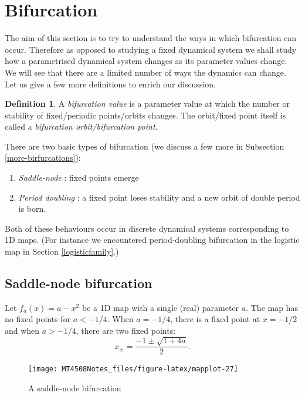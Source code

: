 \documentclass[
  a4paper,
  oneside,
  final]{krantz}
\providecommand{\tightlist}{%
  \setlength{\itemsep}{0pt}\setlength{\parskip}{0pt}}
\theoremstyle{definition}
\newtheorem{definition}{Definition}[chapter]
\theoremstyle{definition}
\theoremstyle{definition}
\theoremstyle{definition}
\theoremstyle{remark}
\begin{document}
\hypertarget{bifurcation-cont}{%
\section{Bifurcation}\label{bifurcation-cont}}

The aim of this section is to try to understand the ways in which
bifurcation can occur. Therefore as opposed to studying a fixed
dynamical system we shall study how a parametrised dynamical system
changes as its parameter values change. We will see that there are a
limited number of ways the dynamics can change. Let us give a few more
definitions to enrich our discussion.

\begin{definition}
\protect\hypertarget{def:bifurcvalue}{}\label{def:bifurcvalue}A \emph{bifurcation value} is a parameter value at which the number or
stability of fixed/periodic points/orbits changes. The orbit/fixed point
itself is called a \emph{bifurcation orbit/bifurcation point}.
\end{definition}

There are two basic types of bifurcation (we discuss a few more in
Subsection \ref{more-birfurcations}):

\begin{enumerate}
\def\labelenumi{\arabic{enumi}.}
\tightlist
\item
  \emph{Saddle-node} : fixed points emerge
\item
  \emph{Period doubling} : a fixed point loses stability and a new orbit of
  double period is born.
\end{enumerate}

Both of these behaviours occur in discrete dynamical systems
corresponding to 1D maps. (For instance we encountered period-doubling
bifurcation in the logistic map in Section \ref{logisticfamily}.)

\hypertarget{saddle-node-bifurcation}{%
\subsection{Saddle-node bifurcation}\label{saddle-node-bifurcation}}

Let \(f_{a}(x) = a-x^2\) be a 1D map with a single (real) parameter \(a\).
The map has no fixed points for \(a < -1/4\). When \(a = -1/4\), there is a
fixed point at \(x = -1/2\) and when \(a> -1/4\), there are two fixed points:
\[ x_{\pm}= \frac{-1 \pm \sqrt{1+ 4a}}{2}.\]

\begin{figure}

{\centering \texttt{[image: MT4508Notes\_files/figure-latex/mapplot-27]} 

}

\caption{A saddle-node bifurcation}\label{fig:mapplot}
\end{figure}
\end{document}
